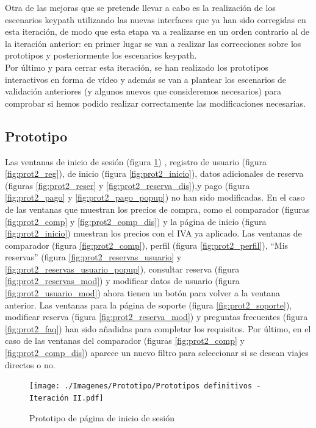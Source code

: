 Otra de las mejoras que se pretende llevar a cabo es la realización de los escenarios keypath utilizando las nuevas interfaces que ya han sido corregidas en esta iteración,
de modo que esta etapa va a realizarse en un orden contrario al de la iteración anterior: en primer lugar se van a realizar las correcciones sobre los prototipos y 
posteriormente los escenarios keypath. \\

Por último y para cerrar esta iteración, se han realizado los prototipos interactivos en forma de vídeo y además se van a plantear los escenarios de validación 
anteriores (y algunos nuevos que consideremos necesarios) para comprobar si hemos podido realizar correctamente las modificaciones necesarias.

\subsection{Prototipo}
Las ventanas de inicio de sesión (figura \ref{fig:prot2_ses}) , registro de usuario (figura \ref{fig:prot2_reg}), de inicio (figura \ref{fig:prot2_inicio}), datos adicionales de reserva (figuras \ref{fig:prot2_reser} y \ref{fig:prot2_reserva_dis}),y pago (figura \ref{fig:prot2_pago} y \ref{fig:prot2_pago_popup}) no han sido modificadas.
En el caso de las ventanas que muestran los precios de compra, como el comparador (figuras \ref{fig:prot2_comp} y \ref{fig:prot2_comp_dis}) y la página de inicio (figura \ref{fig:prot2_inicio}) muestran los precios con el IVA ya aplicado.
Las ventanas de comparador (figura \ref{fig:prot2_comp}), perfil (figura \ref{fig:prot2_perfil}), ``Mis reservas'' (figura \ref{fig:prot2_reservas_usuario} y \ref{fig:prot2_reservas_usuario_popup}), consultar reserva (figura \ref{fig:prot2_reservas_mod}) y modificar datos de usuario (figura \ref{fig:prot2_usuario_mod}) ahora tienen un botón para volver a la ventana anterior.
Las ventanas para la página de soporte (figura \ref{fig:prot2_soporte}), modificar reserva (figura \ref{fig:prot2_reserva_mod}) y preguntas frecuentes (figura \ref{fig:prot2_faq}) han sido añadidas para completar los requisitos. Por último, en el caso de las ventanas del comparador (figuras \ref{fig:prot2_comp} y \ref{fig:prot2_comp_dis}) aparece un nuevo filtro para seleccionar si se desean viajes directos o no.
\begin{figure}[H]
      \centering
      \texttt{[image: ./Imagenes/Prototipo/Prototipos definitivos - Iteración II.pdf]}
      \caption{Prototipo de página de inicio de sesión}
      \label{fig:prot2_ses}
\end{figure}

